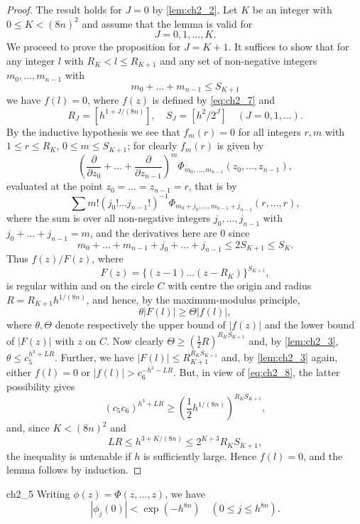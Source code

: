 \begin{proof}
The result holds for $J = 0$ by \autoref{lem:ch2_2}. Let $K$ be an integer with $0 \le K < (8n)^2$ and assume that the lemma is valid for
\[
J = 0, 1, \dots, K.
\]
We proceed to prove the proposition for $J = K + 1$.
It suffices to show that for any integer $l$ with $R_K < l \le R_{K+1}$ and any set of non-negative integers $m_0, \dots, m_{n-1}$ with
\[
m_0 + \dots + m_{n-1} \le S_{K+1}
\]
we have $f(l) = 0$, where $f(z)$ is defined by \eqref{eq:ch2_7} and
\[
R_J = \left[h^{1+J/(8n)}\right], \quad S_J = \left[h^2/2^J\right] \quad (J = 0, 1, \dots).
\]
By the inductive hypothesis we see that $f_m(r) = 0$ for all integers $r, m$ with $1 \le r \le R_K$, $0 \le m \le S_{K+1}$; for clearly $f_m(r)$ is given by
\[
\left(\frac{\partial}{\partial z_0} + \dots + \frac{\partial}{\partial z_{n-1}}\right)^m \Phi_{m_0, \dots, m_{n-1}}(z_0, \dots, z_{n-1}),
\]
evaluated at the point $z_0 = \dots = z_{n-1} = r$, that is by
\[
\sum m! (j_0! \dots j_{n-1}!)^{-1} \Phi_{m_0+j_0, \dots, m_{n-1}+j_{n-1}}(r, \dots, r),
\]
where the sum is over all non-negative integers $j_0, \dots, j_{n-1}$ with $j_0 + \dots + j_{n-1} = m$, and the derivatives here are $0$ since
\[
m_0 + \dots + m_{n-1} + j_0 + \dots + j_{n-1} \le 2S_{K+1} \le S_K.
\]
Thus $f(z)/F(z)$, where
\[
F(z) = \{(z-1) \dots (z-R_K)\}^{S_{K+1}},
\]
is regular within and on the circle $C$ with centre the origin and radius $R = R_{K+1} h^{1/(8n)}$, and hence, by the maximum-modulus principle,
\begin{equation} \label{eq:ch2_8}\tag{8}
\theta |F(l)| \ge \Theta |f(l)|,
\end{equation}
where $\theta, \Theta$ denote respectively the upper bound of $|f(z)|$ and the lower bound of $|F(z)|$ with $z$ on $C$. Now clearly $\Theta \ge (\frac{1}{2}R)^{R_K S_{K+1}}$ and, by \autoref{lem:ch2_3}, $\theta \le c_5^{h^3+LR}$. Further, we have $|F(l)| \le R_{K+1}^{R_K S_{K+1}}$ and, by \autoref{lem:ch2_3} again, either $f(l) = 0$ or $|f(l)| > c_6^{-h^3-LR}$. But, in view of \eqref{eq:ch2_8}, the latter possibility gives
\[
(c_5 c_6)^{h^3+LR} \ge \left(\frac{1}{2} h^{1/(8n)}\right)^{R_K S_{K+1}},
\]
and, since $K < (8n)^2$ and
\[
LR \le h^{3+K/(8n)} \le 2^{K+3} R_K S_{K+1},
\]
the inequality is untenable if $h$ is sufficiently large. Hence $f(l) = 0$, and the lemma follows by induction.
\end{proof}

\begin{mylemma}{}{ch2_5}
Writing $\phi(z) = \Phi(z, \dots, z)$, we have
\begin{equation} \label{eq:ch2_9}\tag{9}
|\phi_j(0)| < \exp(-h^{8n}) \quad (0 \le j \le h^{8n}).
\end{equation}
\end{mylemma}

